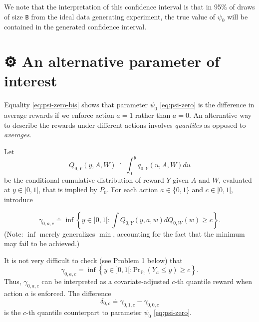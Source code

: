 \documentclass[11pt,openright,twoside]{book}
\newcommand{\gear}{\usebox{\gearbox}\;}
\newcommand{\bbP}{\mathbb{P}}
\newcommand{\defq}{\doteq}
\renewcommand{\Pr}{\textrm{Pr}}
\theoremstyle{definition}
\theoremstyle{definition}
\theoremstyle{definition}
\theoremstyle{remark}
\begin{document}
We note that the interpretation of this confidence interval is that in 95\% of
draws of size \texttt{B} from the ideal data generating experiment, the true value of
\(\psi_0\) will be contained in the generated confidence interval.

\hypertarget{exo-alternative-parameter-first-pass}{%
\section{\texorpdfstring{⚙ \gear An alternative parameter of interest}{⚙ An alternative parameter of interest}}\label{exo-alternative-parameter-first-pass}}

Equality \eqref{eq:psi-zero-bis} shows that parameter \(\psi_0\)
\eqref{eq:psi-zero} is the difference in average rewards if we enforce action
\(a = 1\) rather than \(a = 0\). An alternative way to describe the rewards under
different actions involves \emph{quantiles} as opposed to \emph{averages}.

Let \begin{equation*} Q_{0,Y}(y,  A, W) \defq \int_{0}^y q_{0,Y}(u,  A, W) du
\end{equation*} be the conditional cumulative distribution of reward \(Y\) given
\(A\) and \(W\), evaluated at \(y \in ]0,1[\), that is implied by \(P_0\). For each
action \(a \in \{0,1\}\) and \(c \in ]0,1[\), introduce

\begin{equation}
\gamma_{0,a,c}  \defq  \inf  \left\{y  \in  ]0,1[ :  \int  Q_{0,Y}(y,  a,  w)
dQ_{0,W}(w) \ge c \right\}. \label{eq:def-quantile}
\end{equation}
(Note: \(\inf\) merely generalizes \(\min\), accounting for the fact that the
minimum may fail to be achieved.)

It is not very difficult to check (see Problem 1 below) that
\begin{equation}\gamma_{0,a,c} =  \inf\left\{y \in ]0,1[  : \Pr_{\bbP_{0}}(Y_a
\leq   y)   \geq   c\right\}.    \label{eq:alter-gamma-zero}\end{equation} Thus,
\(\gamma_{0,a,c}\) can be interpreted as a covariate-adjusted \(c\)-th quantile
reward when action \(a\) is enforced. The difference
\begin{equation}\delta_{0,c}    \defq    \gamma_{0,1,c}   -    \gamma_{0,0,c}
\label{eq:def-delta}\end{equation} is the \(c\)-th quantile counterpart to parameter
\(\psi_{0}\) \eqref{eq:psi-zero}.
\end{document}
